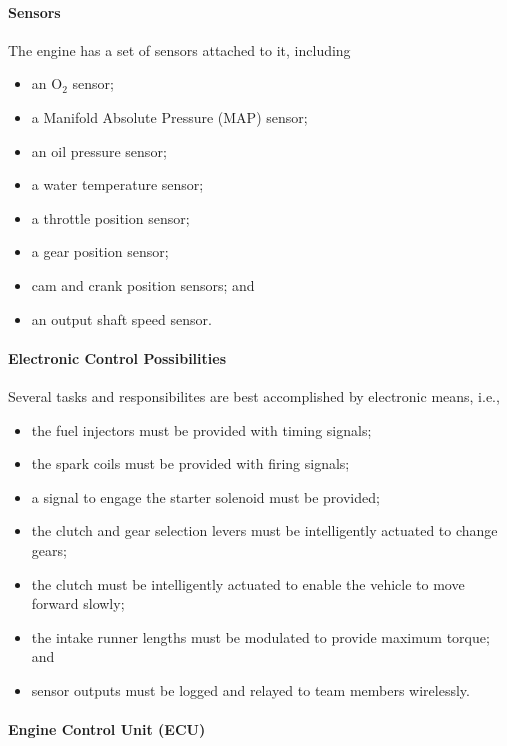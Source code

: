 \paragraph{Sensors}

The engine has a set of sensors attached to it, including

\begin{itemize}
\item an O$_{2}$ sensor;
\item a Manifold Absolute Pressure (MAP) sensor; 
\item an oil pressure sensor;
\item a water temperature sensor;
\item a throttle position sensor;
\item a gear position sensor;
\item cam and crank position sensors; and
\item an output shaft speed sensor.
\end{itemize}

\paragraph{Electronic Control Possibilities}

Several tasks and responsibilites are best accomplished by electronic means, i.e.,

\begin{itemize}
\item the fuel injectors must be provided with timing signals;
\item the spark coils must be provided with firing signals;
\item a signal to engage the starter solenoid must be provided;
\item the clutch and gear selection levers must be intelligently actuated to change gears; 
\item the clutch must be intelligently actuated to enable the vehicle to move forward slowly;
\item the intake runner lengths must be modulated to provide maximum torque; and
\item sensor outputs must be logged and relayed to team members wirelessly.
\end{itemize}

\paragraph{Engine Control Unit (ECU)}

